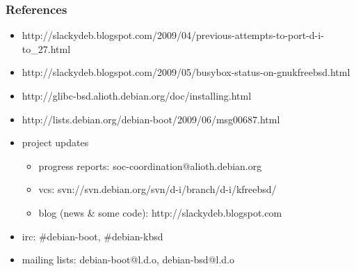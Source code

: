 \documentclass{beamer}
\begin{document}
\begin{frame}
  \frametitle{References}

  \begin{itemize}
  \item
    \text{[0]}
    http://slackydeb.blogspot.com/2009/04/previous-attempts-to-port-d-i-to\_27.html
  \item
    \text{[1]}
    http://slackydeb.blogspot.com/2009/05/busybox-status-on-gnukfreebsd.html
  \item
    \text{[2]}
    http://glibc-bsd.alioth.debian.org/doc/installing.html
  \item
    \text{[3]}
    http://lists.debian.org/debian-boot/2009/06/msg00687.html
  \end{itemize}

  \begin{itemize}
  \item
    project updates
    \begin{itemize}
    \item
      progress reports: soc-coordination@alioth.debian.org
    \item
      vcs: svn://svn.debian.org/svn/d-i/branch/d-i/kfreebsd/
    \item
      blog (news \& some code): http://slackydeb.blogspot.com
    \end{itemize}
  \item
    irc: \#debian-boot, \#debian-kbsd
  \item
    mailing lists: debian-boot@l.d.o, debian-bsd@l.d.o
  \end{itemize}

\end{frame}
\end{document}
